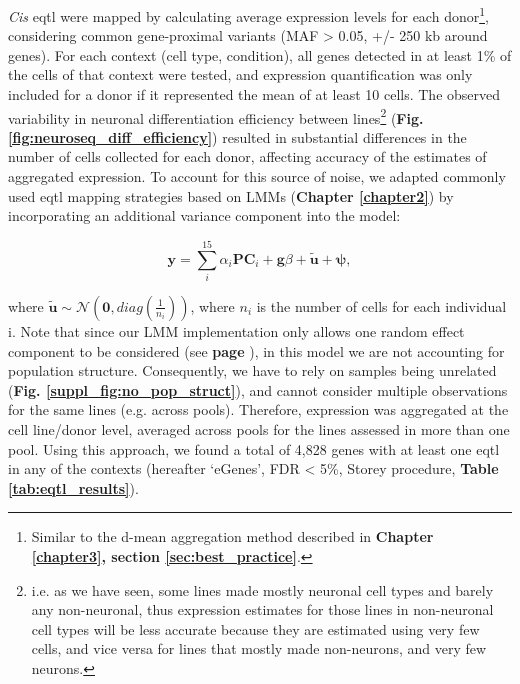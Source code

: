 \textit{Cis} \gls{eqtl} were mapped by calculating average expression levels for each donor\footnote{Similar to the d-mean aggregation method described in \textbf{Chapter \ref{chapter3}, section \ref{sec:best_practice}}.}, considering common gene-proximal variants (MAF > 0.05, +/- 250 kb around genes). 
For each context (cell type, condition), all genes detected in at least 1\% of the cells of that context
were tested, and expression quantification was only included for a donor if it represented the mean of at least 10 cells. 
The observed variability in neuronal differentiation efficiency between lines\footnote{i.e. as we have seen, some lines made mostly neuronal cell types and barely any non-neuronal, thus expression estimates for those lines in non-neuronal cell types will be less accurate because they are estimated using very few cells, and vice versa for lines that mostly made non-neurons, and very few neurons.} (\textbf{Fig. \ref{fig:neuroseq_diff_efficiency}}) resulted in substantial differences in the number of cells collected for each donor, affecting accuracy of the estimates of aggregated expression. 
To account for this source of noise, we adapted commonly used \gls{eqtl} mapping strategies \cite{cuomo2020single} based on LMMs (\textbf{Chapter \ref{chapter2}}) by incorporating an additional variance component into the model:

\begin{equation}\label{eq:neuroseq_ncell}
    \mathbf{y} = \sum_i^{15}\alpha_i \mathbf{PC}_i + \mathbf{g}\beta + \tilde{\mathbf{u}} + \boldsymbol{\psi}, 
\end{equation}

where $\tilde{\mathbf{u}} \sim \mathcal{N}(\mathbf{0}, diag(\frac{1}{n_i}))$, where $n_i$ is the number of cells for each individual i.
Note that since our LMM implementation only allows one random effect component to be considered (see\textbf{ page \pageref{sec:non_gaussian}}), in this model we are not accounting for population structure.
Consequently, we have to rely on samples being unrelated (\textbf{Fig. \ref{suppl_fig:no_pop_struct}}), and cannot consider multiple observations for the same lines (e.g. across pools). 
Therefore, expression was aggregated at the cell line/donor level, averaged across pools for the lines assessed in more than one pool. 
Using this approach, we found
a total of 4,828 genes with at least one \gls{eqtl} in any of the contexts (hereafter `eGenes', FDR < 5\%, Storey procedure, \textbf{Table \ref{tab:eqtl_results}}).

